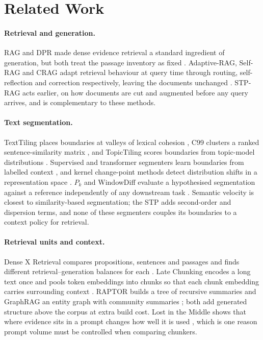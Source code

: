 \documentclass[10pt,a4paper]{article}
\begin{document}
\section{Related Work}
\label{sec:related}

\paragraph{Retrieval and generation.} RAG and DPR made dense evidence retrieval a standard ingredient of generation, but both treat the passage inventory as fixed \cite{lewis2020rag,karpukhin2020dpr}. Adaptive-RAG, Self-RAG and CRAG adapt retrieval behaviour at query time through routing, self-reflection and correction respectively, leaving the documents unchanged \cite{jeong2024adaptiverag,asai2024selfrag,yan2024crag}. STP-RAG acts earlier, on how documents are cut and augmented before any query arrives, and is complementary to these methods.

\paragraph{Text segmentation.} TextTiling places boundaries at valleys of lexical cohesion \cite{hearst1997texttiling}, C99 clusters a ranked sentence-similarity matrix \cite{choi2000c99}, and TopicTiling scores boundaries from topic-model distributions \cite{riedl2012topictiling}. Supervised and transformer segmenters learn boundaries from labelled context \cite{koshorek2018textseg,lo2021transformer2}, and kernel change-point methods detect distribution shifts in a representation space \cite{arlot2019kernelchangepoint}. $P_k$ and WindowDiff evaluate a hypothesised segmentation against a reference independently of any downstream task \cite{beeferman1999statistical,pevzner2002windowdiff}. Semantic velocity is closest to similarity-based segmentation; the STP adds second-order and dispersion terms, and none of these segmenters couples its boundaries to a context policy for retrieval.

\paragraph{Retrieval units and context.} Dense X Retrieval compares propositions, sentences and passages and finds different retrieval--generation balances for each \cite{chen2024densex}. Late Chunking encodes a long text once and pools token embeddings into chunks so that each chunk embedding carries surrounding context \cite{gunther2024latechunking}. RAPTOR builds a tree of recursive summaries \cite{sarthi2024raptor} and GraphRAG an entity graph with community summaries \cite{edge2024graphrag}; both add generated structure above the corpus at extra build cost. Lost in the Middle shows that where evidence sits in a prompt changes how well it is used \cite{liu2024lostmiddle}, which is one reason prompt volume must be controlled when comparing chunkers.
\end{document}

